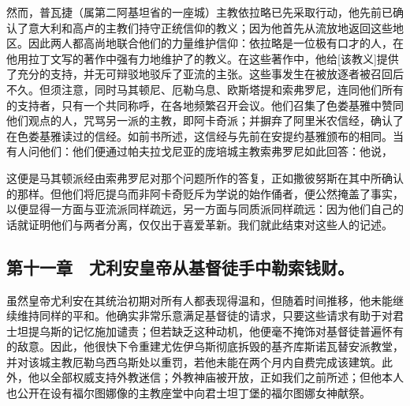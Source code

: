 然而，普瓦捷（属第二阿基坦省的一座城）主教依拉略已先采取行动，他先前已确认了意大利和高卢的主教们持守正统信仰的教义；因为他首先从流放地返回这些地区。因此两人都高尚地联合他们的力量维护信仰：依拉略是一位极有口才的人，在他用拉丁文写的著作中强有力地维护了的教义。在这些著作中，他给[该教义]提供了充分的支持，并无可辩驳地驳斥了亚流的主张。这些事发生在被放逐者被召回后不久。但须注意，同时马其顿尼、厄勒乌息、欧斯塔提和索弗罗尼，连同他们所有的支持者，只有一个共同称呼，在各地频繁召开会议。他们召集了色娄基雅中赞同他们观点的人，咒骂另一派的主教，即阿卡奇派；并摒弃了阿里米农信经，确认了在色娄基雅读过的信经。如前书所述，这信经与先前在安提约基雅颁布的相同。当有人问他们：他们便通过帕夫拉戈尼亚的庞培城主教索弗罗尼如此回答：他说，\par

这便是马其顿派经由索弗罗尼对那个问题所作的答复，正如撒彼努斯在其中所确认的那样。但他们将厄提乌而非阿卡奇贬斥为学说的始作俑者，便公然掩盖了事实，以便显得一方面与亚流派同样疏远，另一方面与同质派同样疏远：因为他们自己的话就证明他们与两者分离，仅仅出于喜爱革新。我们就此结束对这些人的记述。\par


\subsection{第十一章　尤利安皇帝从基督徒手中勒索钱财。}

虽然皇帝尤利安在其统治初期对所有人都表现得温和，但随着时间推移，他未能继续维持同样的平和。他确实非常乐意满足基督徒的请求，只要这些请求有助于对君士坦提乌斯的记忆施加谴责；但若缺乏这种动机，他便毫不掩饰对基督徒普遍怀有的敌意。因此，他很快下令重建尤佐伊乌斯彻底拆毁的基齐库斯诺瓦替安派教堂，并对该城主教厄勒乌西乌斯处以重罚，若他未能在两个月内自费完成该建筑。此外，他以全部权威支持外教迷信；外教神庙被开放，正如我们之前所述；但他本人也公开在设有福尔图娜像的主教座堂中向君士坦丁堡的福尔图娜女神献祭。\par

